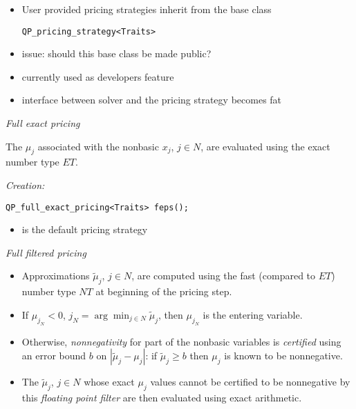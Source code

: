 \documentclass{slides}
\begin{document}
\begin{note}
\begin{itemize}
\item User provided pricing strategies inherit from the base class
\begin{verbatim}
QP_pricing_strategy<Traits>
\end{verbatim}

\item issue: should this base class be made public?
\item currently used as developers feature
\item interface between solver and the pricing strategy becomes fat
\end{itemize}
\end{note}


\begin{slide}
\emph{Full exact pricing}

The $\mu_{j}$ associated with the nonbasic $x_{j}$, $j \in N$, are
evaluated using the exact number type $ET$.

\emph{Creation:}
\begin{verbatim}
QP_full_exact_pricing<Traits> feps();
\end{verbatim}
\end{slide}

\begin{note}
\begin{itemize}
\item is the default pricing strategy
\end{itemize}
\end{note}

\begin{slide}
\emph{Full filtered pricing}

\begin{itemize}
\item Approximations $\tilde{\mu}_{j}$, $j \in N$, are computed using the fast
(compared to $ET$) number type $NT$ at beginning of the pricing step.

\item If $\mu_{j_{N}} < 0$, $j_{N}=\arg\min_{j \in N}\tilde{\mu}_{j}$, then 
$\mu_{j_{N}}$ is the entering variable.

\item Otherwise, \emph{nonnegativity} for part of the nonbasic variables is
\emph{certified} using an error bound $b$ on
$\left|\tilde{\mu}_{j}-\mu_{j}\right|$: if $\tilde{\mu}_{j} \geq b$ then
$\mu_{j}$ is known to be nonnegative.

\item The $\tilde{\mu}_{j}$, $j \in N$ whose exact $\mu_{j}$ values cannot be
certified to be nonnegative by this \emph{floating point filter} are then
evaluated using exact arithmetic. 
\end{itemize}
\end{slide}
\end{document}
